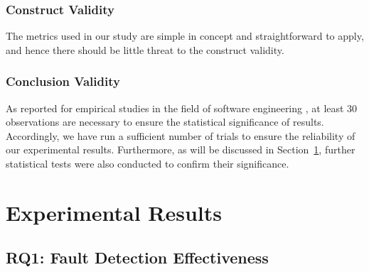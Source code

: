 \documentclass[10pt,journal,compsoc]{IEEEtran}
\begin{document}
\subsubsection{Construct Validity}
\label{sec:construct}

The metrics used in our study are simple in concept and straightforward to apply, and hence there should be little threat to the construct validity.

\subsubsection{Conclusion Validity}
\label{sec:conclusion}

As reported for empirical studies in the field of software engineering \cite{arcuri2011practical},  at least 30 observations are necessary to ensure the statistical significance of results.
Accordingly, we have run a sufficient number of trials to ensure the  reliability of our experimental results.
Furthermore, as will be discussed in Section~\ref{sec:results}, further statistical tests were also conducted to confirm their significance.

\section{Experimental Results}
\label{sec:results}

\subsection{RQ1: Fault Detection Effectiveness}
\label{sec:RQ1}
\end{document}
